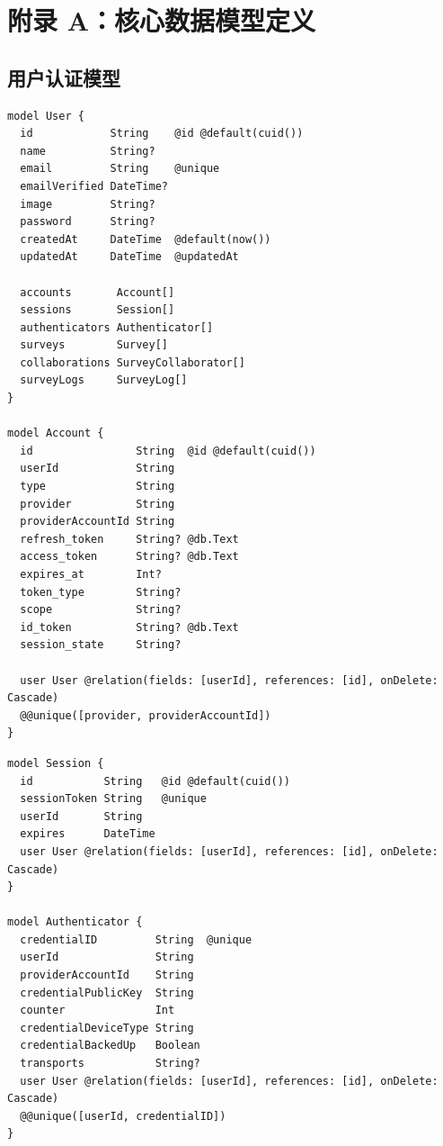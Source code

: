 \section{附录 A：核心数据模型定义}

\subsection{用户认证模型}

\begin{verbatim}
model User {
  id            String    @id @default(cuid())
  name          String?
  email         String    @unique
  emailVerified DateTime?
  image         String?
  password      String?
  createdAt     DateTime  @default(now())
  updatedAt     DateTime  @updatedAt

  accounts       Account[]
  sessions       Session[]
  authenticators Authenticator[]
  surveys        Survey[]
  collaborations SurveyCollaborator[]
  surveyLogs     SurveyLog[]
}

model Account {
  id                String  @id @default(cuid())
  userId            String
  type              String
  provider          String
  providerAccountId String
  refresh_token     String? @db.Text
  access_token      String? @db.Text
  expires_at        Int?
  token_type        String?
  scope             String?
  id_token          String? @db.Text
  session_state     String?

  user User @relation(fields: [userId], references: [id], onDelete: Cascade)
  @@unique([provider, providerAccountId])
}
\end{verbatim}

\begin{verbatim}
model Session {
  id           String   @id @default(cuid())
  sessionToken String   @unique
  userId       String
  expires      DateTime
  user User @relation(fields: [userId], references: [id], onDelete: Cascade)
}

model Authenticator {
  credentialID         String  @unique
  userId               String
  providerAccountId    String
  credentialPublicKey  String
  counter              Int
  credentialDeviceType String
  credentialBackedUp   Boolean
  transports           String?
  user User @relation(fields: [userId], references: [id], onDelete: Cascade)
  @@unique([userId, credentialID])
}
\end{verbatim}

